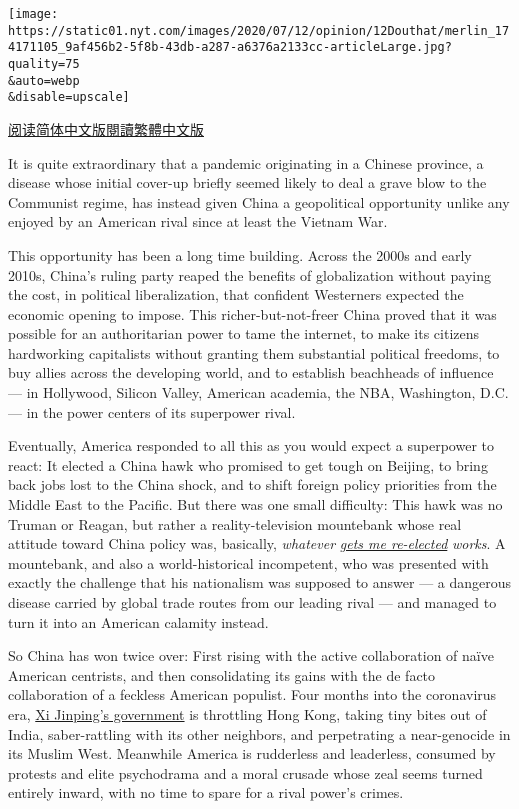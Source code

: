 \texttt{[image: https://static01.nyt.com/images/2020/07/12/opinion/12Douthat/merlin\_174171105\_9af456b2-5f8b-43db-a287-a6376a2133cc-articleLarge.jpg?quality=75\\\&auto=webp\\\&disable=upscale]}

\href{https://cn.nytimes.com/opinion/20200713/china-coronavirus-power/}{阅读简体中文版}\href{https://cn.nytimes.com/opinion/20200713/china-coronavirus-power/zh-hant/}{閱讀繁體中文版}

It is quite extraordinary that a pandemic originating in a Chinese
province, a disease whose initial cover-up briefly seemed likely to deal
a grave blow to the Communist regime, has instead given China a
geopolitical opportunity unlike any enjoyed by an American rival since
at least the Vietnam War.

This opportunity has been a long time building. Across the 2000s and
early 2010s, China's ruling party reaped the benefits of globalization
without paying the cost, in political liberalization, that confident
Westerners expected the economic opening to impose. This
richer-but-not-freer China proved that it was possible for an
authoritarian power to tame the internet, to make its citizens
hardworking capitalists without granting them substantial political
freedoms, to buy allies across the developing world, and to establish
beachheads of influence --- in Hollywood, Silicon Valley, American
academia, the NBA, Washington, D.C. --- in the power centers of its
superpower rival.

Eventually, America responded to all this as you would expect a
superpower to react: It elected a China hawk who promised to get tough
on Beijing, to bring back jobs lost to the China shock, and to shift
foreign policy priorities from the Middle East to the Pacific. But there
was one small difficulty: This hawk was no Truman or Reagan, but rather
a reality-television mountebank whose real attitude toward China policy
was, basically, \emph{whatever}
\href{https://www.wsj.com/articles/john-bolton-the-scandal-of-trumps-china-policy-11592419564}{\emph{gets
me re-elected}} \emph{works}. A mountebank, and also a world-historical
incompetent, who was presented with exactly the challenge that his
nationalism was supposed to answer --- a dangerous disease carried by
global trade routes from our leading rival --- and managed to turn it
into an American calamity instead.

So China has won twice over: First rising with the active collaboration
of naïve American centrists, and then consolidating its gains with the
de facto collaboration of a feckless American populist. Four months into
the coronavirus era,
\href{https://www.ft.com/content/a0eac4d1-625d-4073-9eee-dcf1bacb749e}{Xi
Jinping's government} is throttling Hong Kong, taking tiny bites out of
India, saber-rattling with its other neighbors, and perpetrating a
near-genocide in its Muslim West. Meanwhile America is rudderless and
leaderless, consumed by protests and elite psychodrama and a moral
crusade whose zeal seems turned entirely inward, with no time to spare
for a rival power's crimes.

